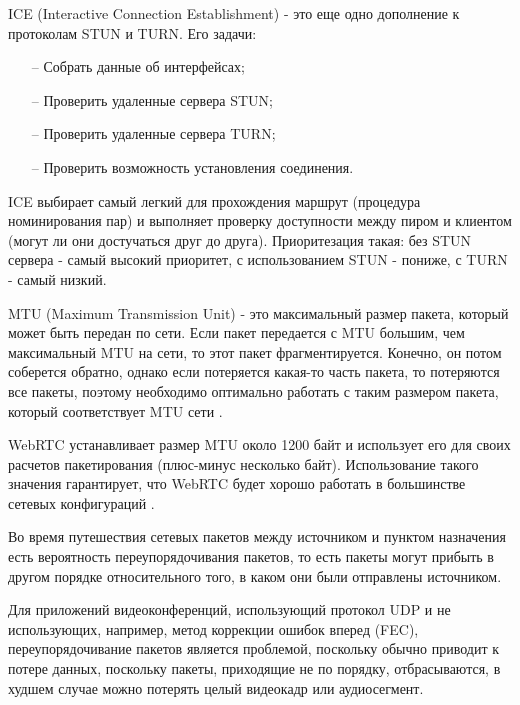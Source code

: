 ICE (Interactive Connection Establishment) - это еще одно дополнение к протоколам STUN и TURN. Его задачи:
\begin{itemize}
	\item[--] Собрать данные об интерфейсах;
        \item[--] Проверить удаленные сервера STUN;
        \item[--] Проверить удаленные сервера TURN;
        \item[--] Проверить возможность установления соединения.
\end{itemize}

ICE выбирает самый легкий для прохождения маршрут (процедура номинирования пар) и выполняет проверку доступности между пиром и клиентом (могут ли они достучаться друг до друга). Приоритезация такая: без STUN сервера - самый высокий приоритет, с использованием STUN - пониже, с TURN - самый низкий.


MTU (Maximum Transmission Unit) - это максимальный размер пакета, который может быть передан по сети. Если пакет передается с MTU большим, чем максимальный MTU на сети, то этот пакет фрагментируется. Конечно, он потом соберется обратно, однако если потеряется какая-то часть пакета, то потеряются все пакеты, поэтому необходимо оптимально работать с таким размером пакета, который соответствует MTU сети \cite{v4}.

WebRTC устанавливает размер MTU около 1200 байт и использует его для своих расчетов пакетирования (плюс-минус несколько байт). Использование такого значения гарантирует, что WebRTC будет хорошо работать в большинстве сетевых конфигураций \cite{v14}.


Во время путешествия сетевых пакетов между источником и пунктом назначения есть вероятность переупорядочивания пакетов, то есть пакеты могут прибыть в другом порядке относительного того, в каком они были отправлены источником.

Для приложений видеоконференций, использующий протокол UDP и не использующих, например, метод коррекции ошибок вперед (FEC), переупорядочивание пакетов является проблемой, поскольку обычно приводит к потере данных, поскольку пакеты, приходящие не по порядку, отбрасываются, в худшем случае можно потерять целый видеокадр или аудиосегмент.

